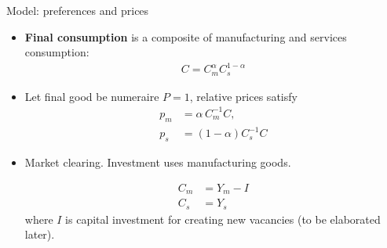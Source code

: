 \documentclass[9pt,xcolor={svgnames}]{beamer}
\begin{document}
\begin{frame}{Model: preferences and prices}\label{main:preference}
  \begin{itemize}
    \item \textbf{Final consumption} is a composite of manufacturing  and services consumption:
      \begin{align*}
                  C = C_m^{\alpha}C_s^{1-\alpha}
      \end{align*}
    
    \vspace{2mm}
\medskip
    \item Let final good be numeraire $P=1$, relative prices satisfy
    \begin{align*}
             p_m &= \alpha\,C_m^{-1}C, \\
        p_s &= (1-\alpha)C_s^{-1}C
    \end{align*}

\item Market clearing. Investment uses manufacturing goods. 

\begin{align*}
    C_m &= Y_m - I\\
    C_s & = Y_s
\end{align*}
where $I$ is capital investment for creating new vacancies (to be elaborated later).
   
  \end{itemize}



\hyperlink{app:proof}{}

  
\end{frame}
\end{document}
